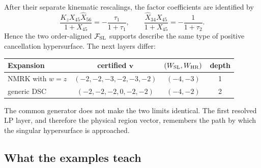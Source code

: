 \documentclass[a4paper,11pt]{article}
\newcommand{\FSL}{\mathcal F_{\rm SL}}
\newcommand{\WSL}{W_{\rm SL}}
\newcommand{\WHR}{W_{\rm HR}}
\begin{document}
After their separate kinematic rescalings, the factor coefficients are
identified by
\begin{equation}
 \frac{K_zX_{45}\widehat X_{56}}{1+X_{45}}
 =-\frac{\tau_1}{1+\tau_1},
 \qquad
 \frac{\widehat X_{34}X_{45}}{1+X_{45}}
 =-\frac{1}{1+\tau_2}.
 \label{eq:composite-factor-map}
\end{equation}
Hence the two order-aligned \(\FSL\) supports describe the same type of
positive cancellation hypersurface.  The next layers differ:
\begin{center}
\begin{tabular}{@{}lccc@{}}
\toprule
Expansion & certified \(\boldsymbol v\) & \((\WSL,\WHR)\) & depth\\
\midrule
NMRK with \(w=z\) & \((-2,-2,-3,-2,-3,-2)\) & \((-4,-3)\) & 1\\
generic DSC & \((-2,-2,-2,0,-2,-2)\) & \((-4,-2)\) & 2\\
\bottomrule
\end{tabular}
\end{center}
The common generator does not make the two limits identical.  The first
resolved LP layer, and therefore the physical region vector, remembers the
path by which the singular hypersurface is approached.

\subsection*{What the examples teach}
\end{document}
